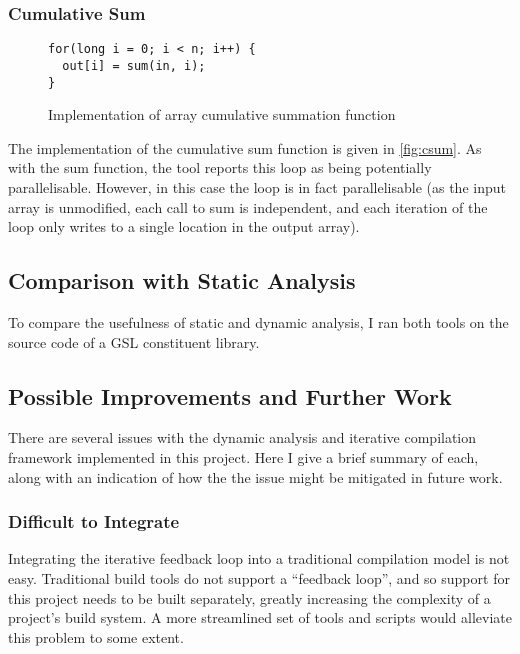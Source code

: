 \documentclass[journal]{IEEEtran}
\begin{document}
\subsubsection{Cumulative Sum}

\begin{figure}[h]
  \centering
  \begin{lstlisting}
for(long i = 0; i < n; i++) {
  out[i] = sum(in, i);
}
  \end{lstlisting}
  \caption{Implementation of array cumulative summation function}
  \label{fig:csum}
\end{figure}

The implementation of the cumulative sum function is given in
\autoref{fig:csum}. As with the sum function, the tool reports this loop as
being potentially parallelisable. However, in this case the loop is in fact
parallelisable (as the input array is unmodified, each call to sum is
independent, and each iteration of the loop only writes to a single location in
the output array).

\subsection{Comparison with Static Analysis} \label{ssec:compare}

To compare the usefulness of static and dynamic analysis, I ran both tools on
the source code of a GSL constituent library.

\subsection{Possible Improvements and Further Work}

There are several issues with the dynamic analysis and iterative compilation
framework implemented in this project. Here I give a brief summary of each,
along with an indication of how the the issue might be mitigated in future work.

\subsubsection{Difficult to Integrate}

Integrating the iterative feedback loop into a traditional compilation model is
not easy. Traditional build tools do not support a ``feedback loop'', and so
support for this project needs to be built separately, greatly increasing the
complexity of a project's build system. A more streamlined set of tools and
scripts would alleviate this problem to some extent.
\end{document}
